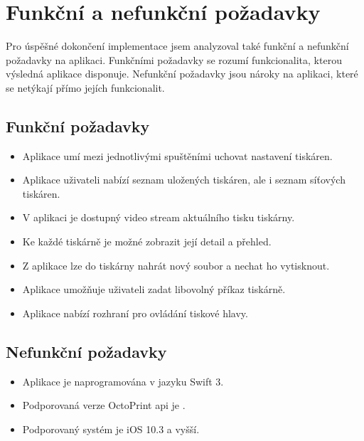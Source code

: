 \section{Funkční a nefunkční požadavky}

Pro úspěšné dokončení implementace jsem analyzoval také funkční a nefunkční požadavky na aplikaci.
Funkčními požadavky se rozumí funkcionalita, kterou výsledná aplikace disponuje.
Nefunkční požadavky jsou nároky na aplikaci, které se netýkají přímo jejích funkcionalit.

\subsection{Funkční požadavky}

\begin{itemize}
    \item Aplikace umí mezi jednotlivými spuštěními uchovat nastavení tiskáren.
    \item Aplikace uživateli nabízí seznam uložených tiskáren, ale i seznam síťových tiskáren.
    \item V aplikaci je dostupný video stream aktuálního tisku tiskárny.
    \item Ke každé tiskárně je možné zobrazit její detail a přehled.
    \item Z aplikace lze do tiskárny nahrát nový soubor a nechat ho vytisknout.
    \item Aplikace umožňuje uživateli zadat libovolný příkaz tiskárně.
    \item Aplikace nabízí rozhraní pro ovládání tiskové hlavy.
\end{itemize}

\subsection{Nefunkční požadavky}

\begin{itemize}
    \item Aplikace je naprogramována v jazyku Swift 3.
    \item Podporovaná verze OctoPrint \acrshort{api} je \vapi{}.
    \item Podporovaný systém je iOS 10.3 a vyšší.
\end{itemize}